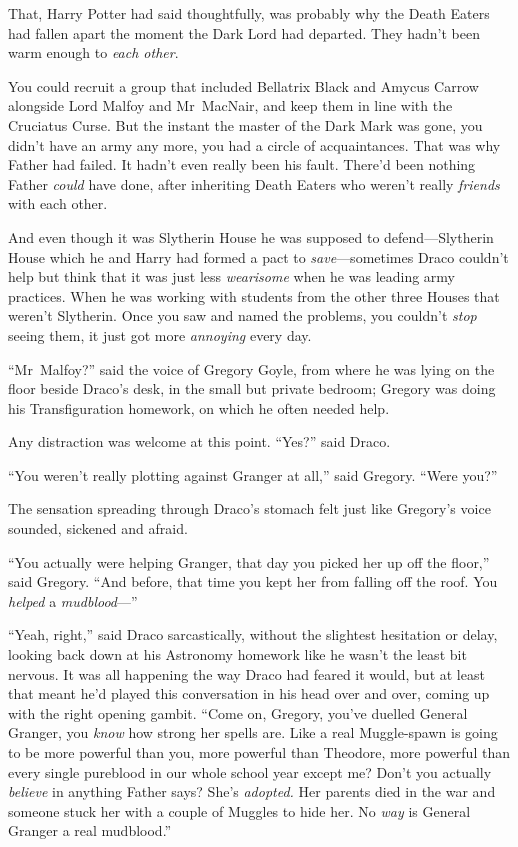 That, Harry Potter had said thoughtfully, was probably why the Death Eaters had
fallen apart the moment the Dark Lord had departed. They hadn’t been warm
enough to \emph{each other}.

You could recruit a group that included Bellatrix Black and Amycus Carrow
alongside Lord Malfoy and Mr~MacNair, and keep them in line with the Cruciatus
Curse. But the instant the master of the Dark Mark was gone, you didn’t have an
army any more, you had a circle of acquaintances. That was why Father had
failed. It hadn’t even really been his fault. There’d been nothing Father
\emph{could} have done, after inheriting Death Eaters who weren’t really
\emph{friends} with each other.

And even though it was Slytherin House he was supposed to defend—Slytherin
House which he and Harry had formed a pact to \emph{save}—sometimes Draco
couldn’t help but think that it was just less \emph{wearisome} when he was
leading army practices. When he was working with students from the other three
Houses that weren’t Slytherin. Once you saw and named the problems, you
couldn’t \emph{stop} seeing them, it just got more \emph{annoying} every day.

“Mr~Malfoy?” said the voice of Gregory Goyle, from where he was lying on the
floor beside Draco’s desk, in the small but private bedroom; Gregory was doing
his Transfiguration homework, on which he often needed help.

Any distraction was welcome at this point. “Yes?” said Draco.

“You weren’t really plotting against Granger at all,” said Gregory. “Were you?”

The sensation spreading through Draco’s stomach felt just like Gregory’s voice
sounded, sickened and afraid.

“You actually were helping Granger, that day you picked her up off the floor,”
said Gregory. “And before, that time you kept her from falling off the roof.
You \emph{helped} a \emph{mudblood}—”

“Yeah, right,” said Draco sarcastically, without the slightest hesitation or
delay, looking back down at his Astronomy homework like he wasn’t the least bit
nervous. It was all happening the way Draco had feared it would, but at least
that meant he’d played this conversation in his head over and over, coming up
with the right opening gambit. “Come on, Gregory, you’ve duelled General
Granger, you \emph{know} how strong her spells are. Like a real Muggle-spawn is
going to be more powerful than you, more powerful than Theodore, more powerful
than every single pureblood in our whole school year except me? Don’t you
actually \emph{believe} in anything Father says? She’s \emph{adopted.} Her
parents died in the war and someone stuck her with a couple of Muggles to hide
her. No \emph{way} is General Granger a real mudblood.”

